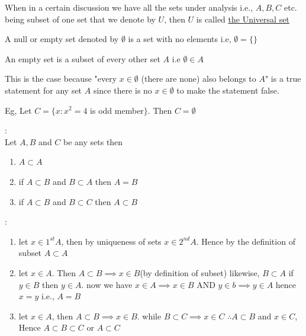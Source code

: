 \begin{para}
    When in a certain discussion we have all the sets under analysis i.e., $A,B,C$ etc. being subset of one set that we denote by $U$, then $U$ is called \underline{the Universal set}
\end{para}

\begin{para}
    A null or empty set denoted by $\emptyset$ is a set with no elements i.e, $\emptyset = \{\}$
\end{para}

\begin{para}
    An empty set is a subset of every other set $A$ i.e $\emptyset \in A$
\end{para}

\begin{para}
    This is the case because "every $x \in \emptyset$ (there are none) also belongs to $A$" is a true statement for any set $A$ since there is no $x \in \emptyset$ to make the statement false.
\end{para}

\begin{para}
    Eg, Let $C = \{x:x^2 = 4$ is odd member$\}$. Then $C = \emptyset$
\end{para}

\begin{theorem}
    :\\Let $A, B$ and $C$ be any sets then
    \begin{enumerate}
        \item $A \subset A$
        \item if $A \subset B$ and $B \subset A$ then $A = B$
        \item if $A \subset B$ and $B \subset C$ then $A \subset B$
    \end{enumerate}
\end{theorem}


\begin{proofs}
    :\\
    \begin{enumerate}
        \item let $x \in 1^{st} A$, then by uniqueness of sets $x \in 2^{nd} A$. Hence by the definition of subset $A \subset A$
        \item let $x \in A$. Then $A \subset B \implies x \in B$(by definition of subset) likewise, $B \subset A$ if $y \in B$ then $y \in A$. now we have $x \in A \implies x \in B$ AND $y \in b \implies y \in A$ hence $x = y$ i.e., $A = B$
        \item let $x \in A$, then $A \subset B \implies x \in B$. while $B \subset C \implies x \in C$ $\therefore A \subset B$ and $x \in C$, Hence $A \subset B \subset C$ or $A \subset C$
    \end{enumerate}
\end{proofs}
